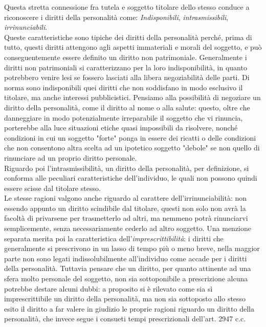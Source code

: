 Questa stretta connessione fra tutela e soggetto titolare dello stesso conduce a riconoscere i diritti della personalità come:
\textit{Indisponibili}, \textit{intrasmissibili}, \textit{irrinunciabili}. 
\\Queste caratteristiche sono tipiche dei diritti della personalità perché, prima di tutto, questi diritti attengono agli aspetti immateriali e morali del soggetto, e può conseguentemente essere definito un diritto non patrimoniale. 
Generalmente i diritti non patrimoniali si caratterizzano per la loro indisponibilità, in quanto potrebbero venire lesi se fossero lasciati alla libera negoziabilità delle parti. Di norma sono indisponibili quei diritti che non soddisfano in modo esclusivo il titolare, ma anche interessi pubblicistici. 
Pensiamo alla possibilità di negoziare un diritto della personalità, come il diritto al nome o alla salute: questo, oltre che danneggiare in modo potenzialmente irreparabile il soggetto che vi rinuncia, porterebbe alla luce situazioni etiche quasi impossibili da risolvere, nonché condizioni in cui un soggetto "forte" ponga in essere dei ricatti o delle condizioni che non consentono altra scelta ad un ipotetico soggetto "debole" se non quello di rinunciare ad un proprio diritto personale.
\\Riguardo poi l'intrasmissibilità, un diritto della personalità, per definizione, si conforma alle peculiari caratteristiche dell'individuo, le quali non possono quindi essere scisse dal titolare stesso. 
\\Le stesse ragioni valgono anche riguardo al carattere dell'irrinunciabilità: non essendo appunto un diritto scindibile dal titolare, questi non solo non avrà la facoltà di privarsene per trasmetterlo ad altri, ma nemmeno potrà rinunciarvi semplicemente, senza necessariamente cederlo ad altro soggetto.
Una menzione separata merita poi la caratteristica dell'\textit{imprescrittibilità}: i diritti che generalmente si prescrivono in un lasso di tempo più o meno breve, nella maggior parte non sono legati indissolubilmente all'individuo come accade per i diritti della personalità. Tuttavia pensare che un diritto, per quanto attinente ad una sfera  molto personale del soggetto, non sia sottoponibile a prescrizione alcuna potrebbe destare alcuni dubbi: a proposito si è rilevato come sia sì imprescrittibile un diritto della personalità, ma non sia sottoposto allo stesso esito il diritto a far valere in giudizio le proprie ragioni riguardo un diritto della personalità, che invece segue i consueti tempi prescrizionali dell'art. 2947 c.c.

